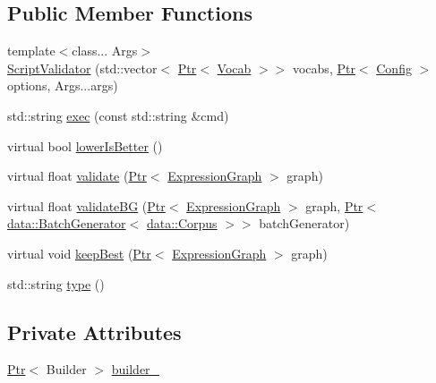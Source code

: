 \subsection*{Public Member Functions}
\begin{DoxyCompactItemize}
\item 
{\footnotesize template$<$class... Args$>$ }\\\hyperlink{classmarian_1_1ScriptValidator_aea9f0815b029147c592d41ae8a897964}{Script\+Validator} (std\+::vector$<$ \hyperlink{namespacemarian_ad1a373be43a00ef9ce35666145137b08}{Ptr}$<$ \hyperlink{classmarian_1_1Vocab}{Vocab} $>$$>$ vocabs, \hyperlink{namespacemarian_ad1a373be43a00ef9ce35666145137b08}{Ptr}$<$ \hyperlink{classmarian_1_1Config}{Config} $>$ options, Args...\+args)
\item 
std\+::string \hyperlink{classmarian_1_1ScriptValidator_a19d938c1fd18d2cb71cec81ccd473fca}{exec} (const std\+::string \&cmd)
\item 
virtual bool \hyperlink{classmarian_1_1ScriptValidator_aef28332c0e50f4d123f7851af2568eee}{lower\+Is\+Better} ()
\item 
virtual float \hyperlink{classmarian_1_1ScriptValidator_a883bb9df22252e25ca4be306713f034d}{validate} (\hyperlink{namespacemarian_ad1a373be43a00ef9ce35666145137b08}{Ptr}$<$ \hyperlink{classmarian_1_1ExpressionGraph}{Expression\+Graph} $>$ graph)
\item 
virtual float \hyperlink{classmarian_1_1ScriptValidator_a0dabd973630921103e7b3a8121a12961}{validate\+BG} (\hyperlink{namespacemarian_ad1a373be43a00ef9ce35666145137b08}{Ptr}$<$ \hyperlink{classmarian_1_1ExpressionGraph}{Expression\+Graph} $>$ graph, \hyperlink{namespacemarian_ad1a373be43a00ef9ce35666145137b08}{Ptr}$<$ \hyperlink{classmarian_1_1data_1_1BatchGenerator}{data\+::\+Batch\+Generator}$<$ \hyperlink{classmarian_1_1data_1_1Corpus}{data\+::\+Corpus} $>$$>$ batch\+Generator)
\item 
virtual void \hyperlink{classmarian_1_1ScriptValidator_a3c0cbf95838821af29430eb5d8de3d5a}{keep\+Best} (\hyperlink{namespacemarian_ad1a373be43a00ef9ce35666145137b08}{Ptr}$<$ \hyperlink{classmarian_1_1ExpressionGraph}{Expression\+Graph} $>$ graph)
\item 
std\+::string \hyperlink{classmarian_1_1ScriptValidator_aba332ac1dc054aa9901cec6cc9282087}{type} ()
\end{DoxyCompactItemize}
\subsection*{Private Attributes}
\begin{DoxyCompactItemize}
\item 
\hyperlink{namespacemarian_ad1a373be43a00ef9ce35666145137b08}{Ptr}$<$ Builder $>$ \hyperlink{classmarian_1_1ScriptValidator_ad9e9bb1342f82248d0d89f3400d0a259}{builder\+\_\+}
\end{DoxyCompactItemize}
